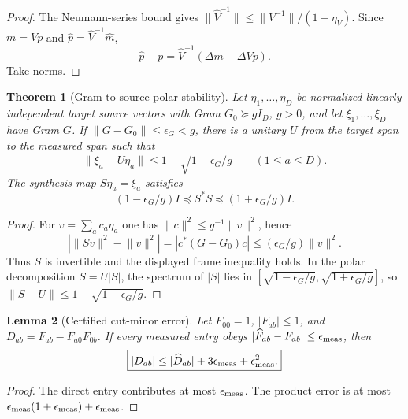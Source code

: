 \documentclass[11pt]{article}
\newtheorem{theorem}{Theorem}[section]
\newtheorem{lemma}[theorem]{Lemma}
\theoremstyle{definition}
\theoremstyle{remark}
\newcommand{\norm}[1]{\lVert#1\rVert}
\begin{document}
\begin{proof}
The Neumann-series bound gives
$\norm{\widehat V^{-1}}\le\norm{V^{-1}}/(1-\eta_V)$.  Since
$m=Vp$ and $\widehat p=\widehat V^{-1}\widehat m$,
\[
  \widehat p-p
  =\widehat V^{-1}(\Delta m-\Delta Vp).
\]
Take norms.
\end{proof}

\begin{theorem}[Gram-to-source polar stability]
\label{thm:Gram-source-stability-master}
Let $\eta_1,\ldots,\eta_D$ be normalized linearly independent target source
vectors with Gram $G_0\succeq gI_D$, $g>0$, and let
$\xi_1,\ldots,\xi_D$ have Gram $G$.  If
$\norm{G-G_0}\le\epsilon_G<g$, there is a unitary $U$ from the target span to
the measured span such that
\begin{equation}
  \boxed{
  \norm{\xi_a-U\eta_a}
  \le1-\sqrt{1-\epsilon_G/g}
  \qquad(1\le a\le D).}
  \label{eq:Gram-source-stability-master}
\end{equation}
The synthesis map $S\eta_a=\xi_a$ satisfies
\[
  (1-\epsilon_G/g)I\preceq S^*S
  \preceq(1+\epsilon_G/g)I.
\]
\end{theorem}

\begin{proof}
For $v=\sum_ac_a\eta_a$ one has
$\norm c^2\le g^{-1}\norm v^2$, hence
\[
  |\norm{Sv}^2-\norm v^2|
  =|c^*(G-G_0)c|
  \le(\epsilon_G/g)\norm v^2.
\]
Thus $S$ is invertible and the displayed frame inequality holds.  In the polar
decomposition $S=U|S|$, the spectrum of $|S|$ lies in
$[\sqrt{1-\epsilon_G/g},\sqrt{1+\epsilon_G/g}]$, so
$\norm{S-U}\le1-\sqrt{1-\epsilon_G/g}$.
\end{proof}

\begin{lemma}[Certified cut-minor error]
\label{lem:cut-minor-error-master}
Let $F_{00}=1$, $|F_{ab}|\le1$, and
$D_{ab}=F_{ab}-F_{a0}F_{0b}$.  If every measured entry obeys
$|\widehat F_{ab}-F_{ab}|\le\epsilon_{\rm meas}$, then
\begin{equation}
  \boxed{
  |D_{ab}|
  \le|\widehat D_{ab}|+3\epsilon_{\rm meas}
      +\epsilon_{\rm meas}^2.}
  \label{eq:cut-minor-error-master}
\end{equation}
\end{lemma}

\begin{proof}
The direct entry contributes at most $\epsilon_{\rm meas}$.  The product error
is at most
$\epsilon_{\rm meas}(1+\epsilon_{\rm meas})+\epsilon_{\rm meas}$.
\end{proof}
\end{document}
